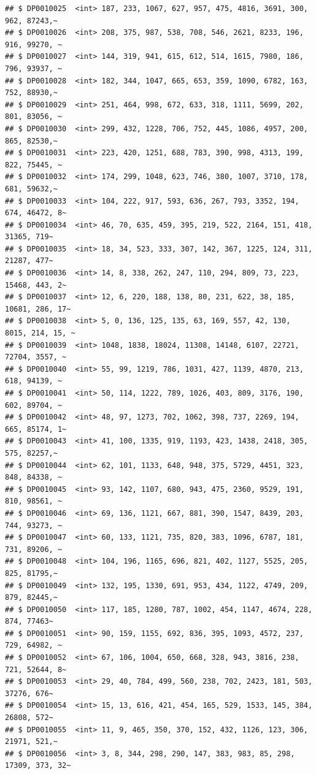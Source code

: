 \documentclass[]{article}
\begin{document}
\begin{verbatim}
## $ DP0010025  <int> 187, 233, 1067, 627, 957, 475, 4816, 3691, 300, 962, 87243,~
## $ DP0010026  <int> 208, 375, 987, 538, 708, 546, 2621, 8233, 196, 916, 99270, ~
## $ DP0010027  <int> 144, 319, 941, 615, 612, 514, 1615, 7980, 186, 796, 93937, ~
## $ DP0010028  <int> 182, 344, 1047, 665, 653, 359, 1090, 6782, 163, 752, 88930,~
## $ DP0010029  <int> 251, 464, 998, 672, 633, 318, 1111, 5699, 202, 801, 83056, ~
## $ DP0010030  <int> 299, 432, 1228, 706, 752, 445, 1086, 4957, 200, 865, 82530,~
## $ DP0010031  <int> 223, 420, 1251, 688, 783, 390, 998, 4313, 199, 822, 75445, ~
## $ DP0010032  <int> 174, 299, 1048, 623, 746, 380, 1007, 3710, 178, 681, 59632,~
## $ DP0010033  <int> 104, 222, 917, 593, 636, 267, 793, 3352, 194, 674, 46472, 8~
## $ DP0010034  <int> 46, 70, 635, 459, 395, 219, 522, 2164, 151, 418, 31365, 719~
## $ DP0010035  <int> 18, 34, 523, 333, 307, 142, 367, 1225, 124, 311, 21287, 477~
## $ DP0010036  <int> 14, 8, 338, 262, 247, 110, 294, 809, 73, 223, 15468, 443, 2~
## $ DP0010037  <int> 12, 6, 220, 188, 138, 80, 231, 622, 38, 185, 10681, 286, 17~
## $ DP0010038  <int> 5, 0, 136, 125, 135, 63, 169, 557, 42, 130, 8015, 214, 15, ~
## $ DP0010039  <int> 1048, 1838, 18024, 11308, 14148, 6107, 22721, 72704, 3557, ~
## $ DP0010040  <int> 55, 99, 1219, 786, 1031, 427, 1139, 4870, 213, 618, 94139, ~
## $ DP0010041  <int> 50, 114, 1222, 789, 1026, 403, 809, 3176, 190, 602, 89704, ~
## $ DP0010042  <int> 48, 97, 1273, 702, 1062, 398, 737, 2269, 194, 665, 85174, 1~
## $ DP0010043  <int> 41, 100, 1335, 919, 1193, 423, 1438, 2418, 305, 575, 82257,~
## $ DP0010044  <int> 62, 101, 1133, 648, 948, 375, 5729, 4451, 323, 848, 84338, ~
## $ DP0010045  <int> 93, 142, 1107, 680, 943, 475, 2360, 9529, 191, 810, 98561, ~
## $ DP0010046  <int> 69, 136, 1121, 667, 881, 390, 1547, 8439, 203, 744, 93273, ~
## $ DP0010047  <int> 60, 133, 1121, 735, 820, 383, 1096, 6787, 181, 731, 89206, ~
## $ DP0010048  <int> 104, 196, 1165, 696, 821, 402, 1127, 5525, 205, 825, 81795,~
## $ DP0010049  <int> 132, 195, 1330, 691, 953, 434, 1122, 4749, 209, 879, 82445,~
## $ DP0010050  <int> 117, 185, 1280, 787, 1002, 454, 1147, 4674, 228, 874, 77463~
## $ DP0010051  <int> 90, 159, 1155, 692, 836, 395, 1093, 4572, 237, 729, 64982, ~
## $ DP0010052  <int> 67, 106, 1004, 650, 668, 328, 943, 3816, 238, 721, 52644, 8~
## $ DP0010053  <int> 29, 40, 784, 499, 560, 238, 702, 2423, 181, 503, 37276, 676~
## $ DP0010054  <int> 15, 13, 616, 421, 454, 165, 529, 1533, 145, 384, 26808, 572~
## $ DP0010055  <int> 11, 9, 465, 350, 370, 152, 432, 1126, 123, 306, 21971, 521,~
## $ DP0010056  <int> 3, 8, 344, 298, 290, 147, 383, 983, 85, 298, 17309, 373, 32~

\end{verbatim}
\end{document}
